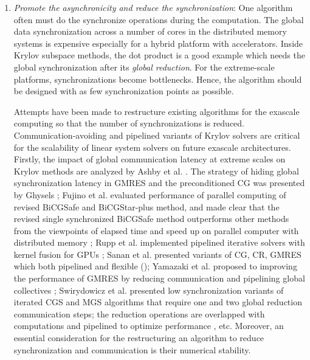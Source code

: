 {\begin{enumerate}[label=(\arabic*)]
    \item \textit{Promote the asynchronicity and reduce the synchronization}: One algorithm often must do the synchronize operations during the computation. The global data synchronization across a number of cores in the distributed memory systems is expensive especially for a hybrid platform with accelerators. Inside Krylov subspace methods, the dot product is a good example which needs the global synchronization after its \textit{global reduction}. For the extreme-scale platforms, synchronizations become bottlenecks. Hence, the algorithm should be designed with as few synchronization points as possible.
	
    Attempts have been made to restructure existing algorithms for the exascale computing so that the number of synchronizations is reduced. Communication-avoiding and pipelined variants of Krylov solvers are critical for the scalability of linear system solvers on future exascale architectures. Firstly, the impact of global communication latency at extreme scales on Krylov methods are analyzed by Ashby et al. \cite{ashby2012impact}. The strategy of hiding global synchronization latency in GMRES and the preconditioned CG was presented by Ghysels \cite{ghysels2013hiding,ghysels2014hiding}; Fujino et al. evaluated performance of parallel computing of revised BiCGSafe and BiCGStar-plus method, and made clear that the revised single synchronized BiCGSafe method outperforms other methods from the viewpoints of elapsed time and speed up on parallel computer with distributed memory \cite{fujino2015estimation}; Rupp et al. implemented pipelined iterative solvers with kernel fusion for GPUs \cite{rupp2016pipelined}; Sanan et al. presented variants of CG, CR, GMRES which both pipelined and flexible (\cite{sanan2016pipelined}); Yamazaki et al. proposed to improving the performance of GMRES by reducing communication and pipelining global collectives \cite{yamazaki2017improving}; Swirydowicz et al. presented low synchronization variants of iterated CGS and MGS algorithms that require one and two global reduction communication steps; the reduction operations are overlapped with computations and pipelined to optimize performance \cite{swirydowicz2018low}, etc. Moreover, an essential consideration for the restructuring an algorithm to reduce synchronization and communication is their numerical stability.
	

\end{enumerate}}
